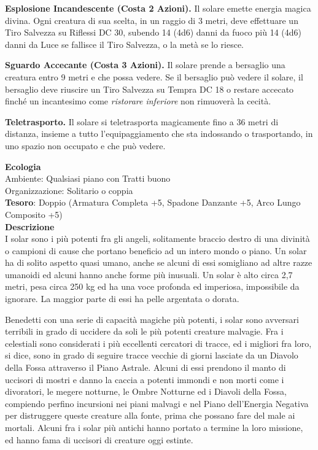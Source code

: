 \begin{multicols}{2}
\textbf{Esplosione Incandescente (Costa 2 Azioni).} Il solare emette energia magica divina. Ogni creatura di sua scelta, in un raggio di 3 metri, deve effettuare un Tiro Salvezza su Riflessi DC 30, subendo 14 (4d6) danni da fuoco più 14 (4d6) danni da Luce se fallisce il Tiro Salvezza, o la metà se lo riesce.

\textbf{Sguardo Accecante (Costa 3 Azioni).} Il solare prende a bersaglio una creatura entro 9 metri e che possa vedere. Se il bersaglio può vedere il solare, il bersaglio deve riuscire un Tiro Salvezza su Tempra DC 18 o restare accecato finché un incantesimo come \textit{ristorare inferiore} non rimuoverà la cecità.

\textbf{Teletrasporto.} Il solare si teletrasporta magicamente fino a 36 metri di distanza, insieme a tutto l'equipaggiamento che sta indossando o trasportando, in uno spazio non occupato e che può vedere.

\textbf{Ecologia}\\
Ambiente: Qualsiasi piano con Tratti buono\\
Organizzazione: Solitario o coppia\\
\textbf{Tesoro}: Doppio (Armatura Completa +5, Spadone Danzante +5, Arco Lungo Composito +5)\\
\textbf{Descrizione}\\
I solar sono i più potenti fra gli angeli, solitamente braccio destro di una divinità o campioni di cause che portano beneficio ad un intero mondo o piano. Un solar ha di solito aspetto quasi umano, anche se alcuni di essi somigliano ad altre razze umanoidi ed alcuni hanno anche forme più inusuali. Un solar è alto circa 2,7 metri, pesa circa 250 kg ed ha una voce profonda ed imperiosa, impossibile da ignorare. La maggior parte di essi ha pelle argentata o dorata.

Benedetti con una serie di capacità magiche più potenti, i solar sono avversari terribili in grado di uccidere da soli le più potenti creature malvagie. Fra i celestiali sono considerati i più eccellenti cercatori di tracce, ed i migliori fra loro, si dice, sono in grado di seguire tracce vecchie di giorni lasciate da un Diavolo della Fossa attraverso il Piano Astrale. Alcuni di essi prendono il manto di uccisori di mostri e danno la caccia a potenti immondi e non morti come i divoratori, le megere notturne, le Ombre Notturne ed i Diavoli della Fossa, compiendo perfino incursioni nei piani malvagi e nel Piano dell'Energia Negativa per distruggere queste creature alla fonte, prima che possano fare del male ai mortali. Alcuni fra i solar più antichi hanno portato a termine la loro missione, ed hanno fama di uccisori di creature oggi estinte.


\end{multicols}
